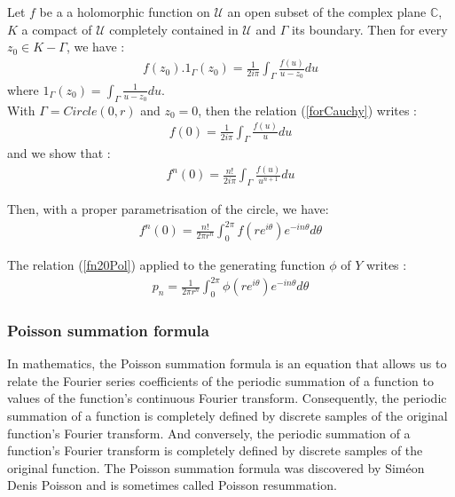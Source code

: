 Let $f$ be a a holomorphic function on $\mathcal{U}$  an open subset of the complex plane $\mathbb{C}$, $K$ a compact of $\mathcal{U}$ completely contained in $\mathcal{U}$ and $\Gamma$ its boundary. Then for every $z_0 \in K-\Gamma$, we have : 
\begin{eqnarray}\label{forCauchy}
 f(z_0).1_{\Gamma}(z_0)= \displaystyle \frac{1}{2i\pi}\int_{\Gamma} \frac{f(u)}{u-z_0}du
\end{eqnarray}
where $1_{\Gamma}(z_0) = \int_{\Gamma} \frac{1}{u-z_0}du$.\\

With $\Gamma = Circle(0,r)$ and $z_0 = 0$, then the relation  (\ref{forCauchy}) writes : 
\begin{eqnarray}\label{f20}
f(0) = \displaystyle \frac{1}{2i\pi}\int_{\Gamma} \frac{f(u)}{u}du
\end{eqnarray}
and we show that : 
\begin{eqnarray}\label{fn20}
f^n(0) = \displaystyle \frac{n!}{2i\pi}\int_{\Gamma} \frac{f(u)}{u^{n+1}}du
\end{eqnarray}

Then, with a proper parametrisation of the circle, we have: 
\begin{eqnarray}\label{fn20Pol}
f^n(0) = \displaystyle \frac{n!}{2\pi r^n}\int_{0}^{2\pi} f\left(re^{i\theta}\right)e^{-in\theta} d\theta
\end{eqnarray}


The relation (\ref{fn20Pol}) applied to the generating function $\phi$ of $Y$ writes :
\begin{eqnarray}\label{pnCauchy}
p_n = \displaystyle \frac{1}{2\pi r^n}\int_{0}^{2\pi} \phi\left(re^{i\theta}\right)e^{-in\theta} d\theta
\end{eqnarray}



\subsubsection{Poisson summation formula}

In mathematics, the Poisson summation formula is an equation that allows us to relate the Fourier series coefficients of the periodic summation of a function to values of the function's continuous Fourier transform. Consequently, the periodic summation of a function is completely defined by discrete samples of the original function's Fourier transform. And conversely, the periodic summation of a function's Fourier transform is completely defined by discrete samples of the original function. The Poisson summation formula was discovered by Siméon Denis Poisson and is sometimes called Poisson resummation.\\


